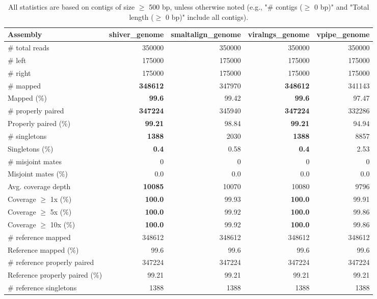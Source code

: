 \documentclass[12pt,a4paper]{article}
\begin{document}
\begin{table}[ht]
\begin{center}
\caption{All statistics are based on contigs of size $\geq$ 500 bp, unless otherwise noted (e.g., "\# contigs ($\geq$ 0 bp)" and "Total length ($\geq$ 0 bp)" include all contigs).}
\begin{tabular}{|l*{4}{|r}|}
\hline
Assembly & shiver\_genome & smaltalign\_genome & viralngs\_genome & vpipe\_genome \\ \hline
\# total reads & 350000 & 350000 & 350000 & 350000 \\ \hline
\# left & 175000 & 175000 & 175000 & 175000 \\ \hline
\# right & 175000 & 175000 & 175000 & 175000 \\ \hline
\# mapped & {\bf 348612} & 347970 & {\bf 348612} & 341143 \\ \hline
Mapped (\%) & {\bf 99.6} & 99.42 & {\bf 99.6} & 97.47 \\ \hline
\# properly paired & {\bf 347224} & 345940 & {\bf 347224} & 332286 \\ \hline
Properly paired (\%) & {\bf 99.21} & 98.84 & {\bf 99.21} & 94.94 \\ \hline
\# singletons & {\bf 1388} & 2030 & {\bf 1388} & 8857 \\ \hline
Singletons (\%) & {\bf 0.4} & 0.58 & {\bf 0.4} & 2.53 \\ \hline
\# misjoint mates & 0 & 0 & 0 & 0 \\ \hline
Misjoint mates (\%) & 0.0 & 0.0 & 0.0 & 0.0 \\ \hline
Avg. coverage depth & {\bf 10085} & 10070 & 10080 & 9796 \\ \hline
Coverage $\geq$ 1x (\%) & {\bf 100.0} & 99.93 & {\bf 100.0} & 99.91 \\ \hline
Coverage $\geq$ 5x (\%) & {\bf 100.0} & 99.92 & {\bf 100.0} & 99.86 \\ \hline
Coverage $\geq$ 10x (\%) & {\bf 100.0} & 99.92 & {\bf 100.0} & 99.86 \\ \hline
\# reference mapped & 348612 & 348612 & 348612 & 348612 \\ \hline
Reference mapped (\%) & 99.6 & 99.6 & 99.6 & 99.6 \\ \hline
\# reference properly paired & 347224 & 347224 & 347224 & 347224 \\ \hline
Reference properly paired (\%) & 99.21 & 99.21 & 99.21 & 99.21 \\ \hline
\# reference singletons & 1388 & 1388 & 1388 & 1388 \\ \hline

\end{tabular}
\end{center}
\end{table}
\end{document}
